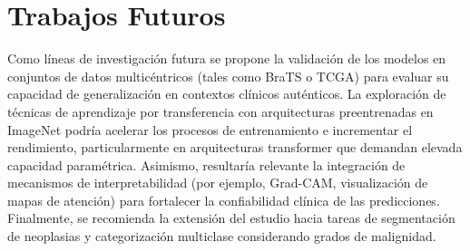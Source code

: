 \section{Trabajos Futuros}
\label{sec:future_work}

Como líneas de investigación futura se propone la validación de los modelos en conjuntos de datos multicéntricos (tales como BraTS o TCGA) para evaluar su capacidad de generalización en contextos clínicos auténticos. La exploración de técnicas de aprendizaje por transferencia con arquitecturas preentrenadas en ImageNet podría acelerar los procesos de entrenamiento e incrementar el rendimiento, particularmente en arquitecturas transformer que demandan elevada capacidad paramétrica. Asimismo, resultaría relevante la integración de mecanismos de interpretabilidad (por ejemplo, Grad-CAM, visualización de mapas de atención) para fortalecer la confiabilidad clínica de las predicciones. Finalmente, se recomienda la extensión del estudio hacia tareas de segmentación de neoplasias y categorización multiclase considerando grados de malignidad.
